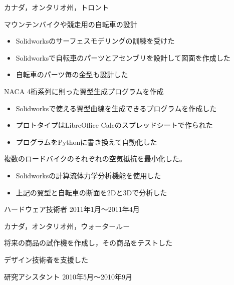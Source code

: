 \documentclass[10pt, a4paper]{article}
\begin{document}
\begin{outerlist}
\vspace{-\baselineskip}    
\hfill カナダ，オンタリオ州，トロント
  \begin{innerlist}
  \item マウンテンバイクや競走用の自転車の設計
  \begin{itemize}
    \item Solidworksのサーフェスモデリングの訓練を受けた
    \item Solidworksで自転車のパーツとアセンブリを設計して図面を作成した
    \item 自転車のパーツ毎の金型も設計した
  \end{itemize}
  \item NACA 4桁系列に則った翼型生成プログラムを作成
  \begin{itemize}
    \item Solidworksで使える翼型曲線を生成できるプログラムを作成した
    \item プロトタイプはLibreOffice Calcのスプレッドシートで作られた
    \item プログラムをPythonに書き換えて自動化した
  \end{itemize}
  \item 複数のロードバイクのそれぞれの空気抵抗を最小化した。
  \begin{itemize}
    \item Solidworksの計算流体力学分析機能を使用した
    \item 上記の翼型と自転車の断面を2Dと3Dで分析した
  \end{itemize}
  \end{innerlist}

\item[\href{http://www.intellimec.com/}{\parbox[t]{3cm}{\raggedleft Intelligent Mechatronics Systems株式会社}}]{ハードウェア技術者} \hfill {2011年1月〜2011年4月}

\vspace{-2\baselineskip}
\hfill カナダ，オンタリオ州，ウォータールー
  \begin{innerlist}
  \item 将来の商品の試作機を作成し，その商品をテストした
  \item デザイン技術者を支援した
  \end{innerlist}

\item[\href{http://rpl.uwaterloo.ca/}{\parbox[t]{3cm}{\raggedleft ウォータールー大学\\マルチスケール\\積層造形研究室}}]{研究アシスタント} \hfill {2010年5月〜2010年9月}


\end{outerlist}
\end{document}
